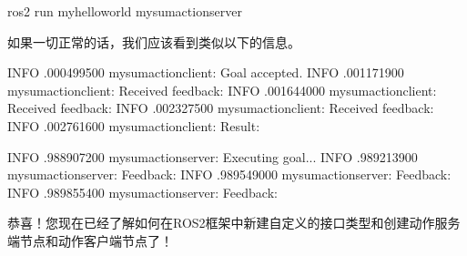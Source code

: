 \documentclass[letterpaper,10pt,english]{sphinxmanual}
\begin{document}
\begin{sphinxVerbatim}[commandchars=\\\{\}]
ros2 run my\PYGZus{}hello\PYGZus{}world my\PYGZus{}sum\PYGZus{}action\PYGZus{}server
\end{sphinxVerbatim}

\sphinxAtStartPar
如果一切正常的话，我们应该看到类似以下的信息。

\begin{sphinxVerbatim}[commandchars=\\\{\}]
\PYG{o}{[}INFO\PYG{o}{]} \PYG{o}{[}.000499500\PYG{o}{]} \PYG{o}{[}my\PYGZus{}sum\PYGZus{}action\PYGZus{}client\PYG{o}{]}: Goal accepted.
\PYG{o}{[}INFO\PYG{o}{]} \PYG{o}{[}.001171900\PYG{o}{]} \PYG{o}{[}my\PYGZus{}sum\PYGZus{}action\PYGZus{}client\PYG{o}{]}: Received feedback: 
\PYG{o}{[}INFO\PYG{o}{]} \PYG{o}{[}.001644000\PYG{o}{]} \PYG{o}{[}my\PYGZus{}sum\PYGZus{}action\PYGZus{}client\PYG{o}{]}: Received feedback: 
\PYG{o}{[}INFO\PYG{o}{]} \PYG{o}{[}.002327500\PYG{o}{]} \PYG{o}{[}my\PYGZus{}sum\PYGZus{}action\PYGZus{}client\PYG{o}{]}: Received feedback: 
\PYG{o}{[}INFO\PYG{o}{]} \PYG{o}{[}.002761600\PYG{o}{]} \PYG{o}{[}my\PYGZus{}sum\PYGZus{}action\PYGZus{}client\PYG{o}{]}: Result: 
\end{sphinxVerbatim}

\begin{sphinxVerbatim}[commandchars=\\\{\}]
\PYG{o}{[}INFO\PYG{o}{]} \PYG{o}{[}.988907200\PYG{o}{]} \PYG{o}{[}my\PYGZus{}sum\PYGZus{}action\PYGZus{}server\PYG{o}{]}: Executing goal...
\PYG{o}{[}INFO\PYG{o}{]} \PYG{o}{[}.989213900\PYG{o}{]} \PYG{o}{[}my\PYGZus{}sum\PYGZus{}action\PYGZus{}server\PYG{o}{]}: Feedback: 
\PYG{o}{[}INFO\PYG{o}{]} \PYG{o}{[}.989549000\PYG{o}{]} \PYG{o}{[}my\PYGZus{}sum\PYGZus{}action\PYGZus{}server\PYG{o}{]}: Feedback: 
\PYG{o}{[}INFO\PYG{o}{]} \PYG{o}{[}.989855400\PYG{o}{]} \PYG{o}{[}my\PYGZus{}sum\PYGZus{}action\PYGZus{}server\PYG{o}{]}: Feedback: 
\end{sphinxVerbatim}

\sphinxAtStartPar
恭喜！您现在已经了解如何在ROS2框架中新建自定义的接口类型和创建动作服务端节点和动作客户端节点了！
\end{document}
